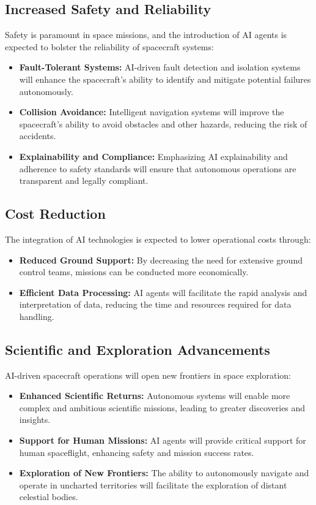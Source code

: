 \documentclass[a4paper, 11pt]{article}
\begin{document}
\subsection{Increased Safety and Reliability}

Safety is paramount in space missions, and the introduction of AI agents is expected to bolster the reliability of spacecraft systems:

\begin{itemize}
    \item \textbf{Fault-Tolerant Systems:} AI-driven fault detection and isolation systems will enhance the spacecraft's ability to identify and mitigate potential failures autonomously.
    \item \textbf{Collision Avoidance:} Intelligent navigation systems will improve the spacecraft's ability to avoid obstacles and other hazards, reducing the risk of accidents.
    \item \textbf{Explainability and Compliance:} Emphasizing AI explainability and adherence to safety standards will ensure that autonomous operations are transparent and legally compliant.
\end{itemize}

\subsection{Cost Reduction}

The integration of AI technologies is expected to lower operational costs through:

\begin{itemize}
    \item \textbf{Reduced Ground Support:} By decreasing the need for extensive ground control teams, missions can be conducted more economically.
    \item \textbf{Efficient Data Processing:} AI agents will facilitate the rapid analysis and interpretation of data, reducing the time and resources required for data handling.
\end{itemize}

\subsection{Scientific and Exploration Advancements}

AI-driven spacecraft operations will open new frontiers in space exploration:

\begin{itemize}
    \item \textbf{Enhanced Scientific Returns:} Autonomous systems will enable more complex and ambitious scientific missions, leading to greater discoveries and insights.
    \item \textbf{Support for Human Missions:} AI agents will provide critical support for human spaceflight, enhancing safety and mission success rates.
    \item \textbf{Exploration of New Frontiers:} The ability to autonomously navigate and operate in uncharted territories will facilitate the exploration of distant celestial bodies.
\end{itemize}
\end{document}

